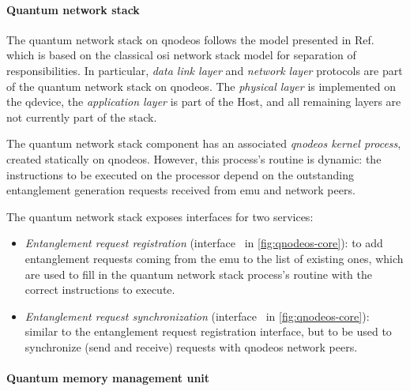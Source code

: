 \paragraph{Quantum network stack}

The quantum network stack on \acrshort{qnodeos} follows the model presented in
Ref.~\cite{dahlberg_2019_egp} which is based on the classical \acrshort{osi} network stack model for
separation of responsibilities. In particular, \emph{data link layer} and \emph{network layer}
protocols are part of the quantum network stack on \acrshort{qnodeos}. The \emph{physical layer} is
implemented on the \acrshort{qdevice}, the \emph{application layer} is part of the Host, and all
remaining layers are not currently part of the stack.

The quantum network stack component has an associated \emph{\acrshort{qnodeos} kernel process},
created statically on \acrshort{qnodeos}. However, this process's routine is dynamic: the
instructions to be executed on the processor depend on the outstanding entanglement generation
requests received from \acrshort{emu} and network peers.

The quantum network stack exposes interfaces for two services:
\begin{itemize}
    \item \emph{Entanglement request registration} (interface~ in
          \cref{fig:qnodeos-core}): to add entanglement requests coming from the \acrshort{emu} to
          the list of existing ones, which are used to fill in the quantum network stack process's
          routine with the correct instructions to execute.
    \item \emph{Entanglement request synchronization} (interface~ in
          \cref{fig:qnodeos-core}): similar to the entanglement request registration interface, but
          to be used to synchronize (send and receive) requests with \acrshort{qnodeos} network
          peers.
\end{itemize}

\paragraph{Quantum memory management unit}

